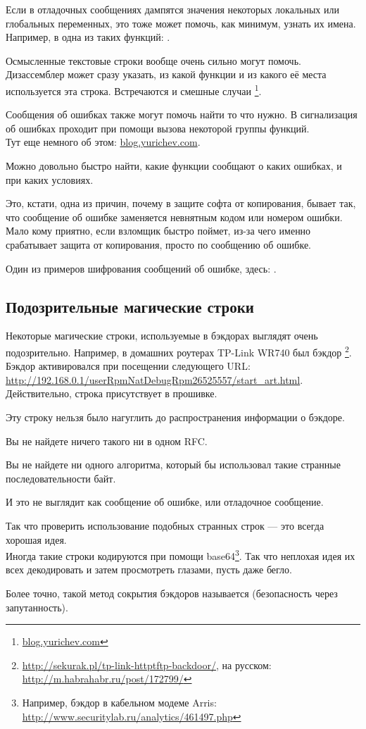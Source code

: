\myindex{\oracle}
Если в отладочных сообщениях дампятся значения некоторых локальных или глобальных переменных, 
это тоже может помочь, как минимум, узнать их имена. 
Например, в \oracle одна из таких функций: .

Осмысленные текстовые строки вообще очень сильно могут помочь. 
Дизассемблер \IDA может сразу указать, из какой функции и из какого её места используется эта строка. 
Встречаются и смешные случаи
\footnote{\href{http://go.yurichev.com/17223}{blog.yurichev.com}}.

Сообщения об ошибках также могут помочь найти то что нужно. 
В \oracle сигнализация об ошибках проходит при помощи вызова некоторой группы функций. \\
Тут еще немного об этом: \href{http://go.yurichev.com/17224}{blog.yurichev.com}.

Можно довольно быстро найти, какие функции сообщают о каких ошибках, и при каких условиях.

Это, кстати, одна из причин, почему в защите софта от копирования, 
бывает так, что сообщение об ошибке заменяется 
невнятным кодом или номером ошибки. Мало кому приятно, если взломщик быстро поймет, 
из-за чего именно срабатывает защита от копирования, просто по сообщению об ошибке.

Один из примеров шифрования сообщений об ошибке, здесь: .

\subsection{Подозрительные магические строки}

Некоторые магические строки, используемые в бэкдорах выглядят очень подозрительно.
Например, в домашних роутерах TP-Link WR740 был бэкдор
\footnote{\url{http://sekurak.pl/tp-link-httptftp-backdoor/}, на русском: \url{http://m.habrahabr.ru/post/172799/}}.
Бэкдор активировался при посещении следующего URL:\\
\url{http://192.168.0.1/userRpmNatDebugRpm26525557/start_art.html}.\\
Действительно, строка  присутствует в прошивке.

Эту строку нельзя было нагуглить до распространения информации о бэкдоре.

Вы не найдете ничего такого ни в одном \ac{RFC}.

Вы не найдете ни одного алгоритма, который бы использовал такие странные последовательности байт.

И это не выглядит как сообщение об ошибке, или отладочное сообщение.

Так что проверить использование подобных странных строк --- это всегда хорошая идея.
\\
Иногда такие строки кодируются при помощи 
base64\footnote{Например, бэкдор в кабельном модеме Arris: 
\url{http://www.securitylab.ru/analytics/461497.php}}.
Так что неплохая идея их всех декодировать и затем просмотреть глазами, пусть даже бегло.
\\

Более точно, такой метод сокрытия бэкдоров называется  (безопасность через
запутанность).

